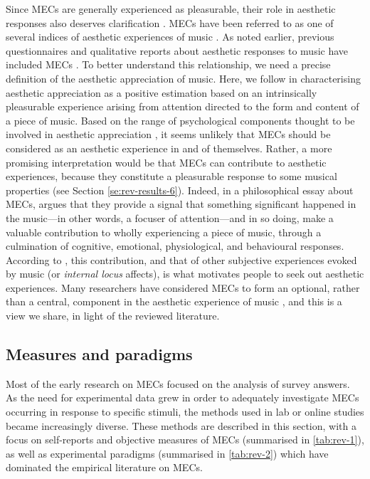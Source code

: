 Since MECs are generally experienced as pleasurable, their role in aesthetic responses also deserves clarification \parencite{hodges2016}. MECs have been referred to as one of several indices of aesthetic experiences of music \parencite{schubert2016, vuust2010}. As noted earlier, previous questionnaires and qualitative reports about aesthetic responses to music have included MECs \parencite{panzarella1980, silvia2011}. To better understand this relationship, we need a precise definition of the aesthetic appreciation of music. Here, we follow \textcite{levinson2009} in characterising aesthetic appreciation as a positive estimation based on an intrinsically pleasurable experience arising from attention directed to the form and content of a piece of music. Based on the range of psychological components thought to be involved in aesthetic appreciation \parencites[see][]{leder2004}[][for another extensive, multi-component model]{leder2014}, it seems unlikely that MECs should be considered as an aesthetic experience in and of themselves. Rather, a more promising interpretation would be that MECs can contribute to aesthetic experiences, because they constitute a pleasurable response to some musical properties (see Section \ref{se:rev-results-6}). Indeed, in a philosophical essay about MECs, \textcite{levinson2006} argues that they provide a signal that something significant happened in the music---in other words, a focuser of attention---and in so doing, make a valuable contribution to wholly experiencing a piece of music, through a culmination of cognitive, emotional, physiological, and behavioural responses. According to \textcite{schubert2016}, this contribution, and that of other subjective experiences evoked by music (or \emph{internal locus} affects), is what motivates people to seek out aesthetic experiences. Many researchers have considered MECs to form an optional, rather than a central, component in the aesthetic experience of music \parencite[e.g.,][]{beriachvili2016, brattico2013b, gabrielsson2016, konecni2007a}, and this is a view we share, in light of the reviewed literature.

\subsection{Measures and paradigms}
\label{se:rev-results-3}

Most of the early research on MECs focused on the analysis of survey answers. As the need for experimental data grew in order to adequately investigate MECs occurring in response to specific stimuli, the methods used in lab or online studies became increasingly diverse. These methods are described in this section, with a focus on self-reports and objective measures of MECs (summarised in \autoref{tab:rev-1}), as well as experimental paradigms (summarised in \autoref{tab:rev-2}) which have dominated the empirical literature on MECs.

